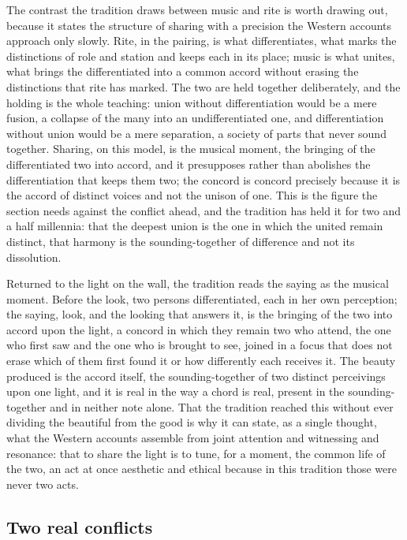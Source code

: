 The contrast the tradition draws between music and rite is worth drawing out, because it states the structure of sharing with a precision the Western accounts approach only slowly. Rite, in the pairing, is what differentiates, what marks the distinctions of role and station and keeps each in its place; music is what unites, what brings the differentiated into a common accord without erasing the distinctions that rite has marked. The two are held together deliberately, and the holding is the whole teaching: union without differentiation would be a mere fusion, a collapse of the many into an undifferentiated one, and differentiation without union would be a mere separation, a society of parts that never sound together. Sharing, on this model, is the musical moment, the bringing of the differentiated two into accord, and it presupposes rather than abolishes the differentiation that keeps them two; the concord is concord precisely because it is the accord of distinct voices and not the unison of one. This is the figure the section needs against the conflict ahead, and the tradition has held it for two and a half millennia: that the deepest union is the one in which the united remain distinct, that harmony is the sounding-together of difference and not its dissolution.

Returned to the light on the wall, the tradition reads the saying as the musical moment. Before the look, two persons differentiated, each in her own perception; the saying, look, and the looking that answers it, is the bringing of the two into accord upon the light, a concord in which they remain two who attend, the one who first saw and the one who is brought to see, joined in a focus that does not erase which of them first found it or how differently each receives it. The beauty produced is the accord itself, the sounding-together of two distinct perceivings upon one light, and it is real in the way a chord is real, present in the sounding-together and in neither note alone. That the tradition reached this without ever dividing the beautiful from the good is why it can state, as a single thought, what the Western accounts assemble from joint attention and witnessing and resonance: that to share the light is to tune, for a moment, the common life of the two, an act at once aesthetic and ethical because in this tradition those were never two acts.

\subsection{Two real conflicts}
\label{p22:sub:sharing-conflicts}

